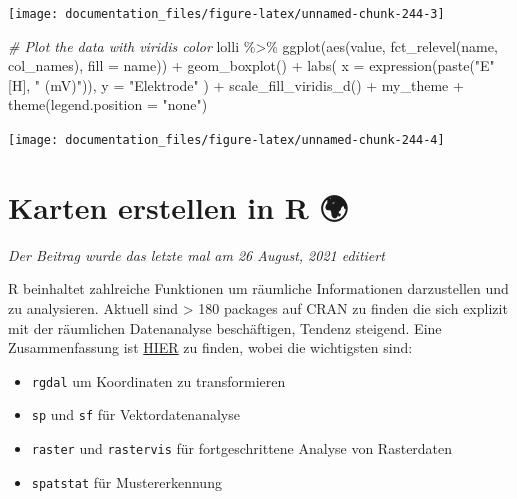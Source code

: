\documentclass[
]{article}
\newenvironment{Shaded}{\begin{snugshade}}{\end{snugshade}}
\newcommand{\AttributeTok}[1]{\textcolor[rgb]{0.77,0.63,0.00}{#1}}
\newcommand{\CommentTok}[1]{\textcolor[rgb]{0.56,0.35,0.01}{\textit{#1}}}
\newcommand{\FunctionTok}[1]{\textcolor[rgb]{0.00,0.00,0.00}{#1}}
\newcommand{\NormalTok}[1]{#1}
\newcommand{\SpecialCharTok}[1]{\textcolor[rgb]{0.00,0.00,0.00}{#1}}
\newcommand{\StringTok}[1]{\textcolor[rgb]{0.31,0.60,0.02}{#1}}
\providecommand{\tightlist}{%
  \setlength{\itemsep}{0pt}\setlength{\parskip}{0pt}}
\begin{document}
\begin{center}\texttt{[image: documentation\_files/figure-latex/unnamed-chunk-244-3]} \end{center}

\begin{Shaded}
\begin{Highlighting}[]

\CommentTok{\# Plot the data with viridis color}
\NormalTok{lolli }\SpecialCharTok{\%\textgreater{}\%}
  \FunctionTok{ggplot}\NormalTok{(}\FunctionTok{aes}\NormalTok{(value, }\FunctionTok{fct\_relevel}\NormalTok{(name, col\_names), }\AttributeTok{fill =}\NormalTok{ name)) }\SpecialCharTok{+} 
  \FunctionTok{geom\_boxplot}\NormalTok{() }\SpecialCharTok{+}
  \FunctionTok{labs}\NormalTok{(}
    \AttributeTok{x =} \FunctionTok{expression}\NormalTok{(}\FunctionTok{paste}\NormalTok{(}\StringTok{"E"}\NormalTok{ [H], }\StringTok{" (mV)"}\NormalTok{)),}
    \AttributeTok{y =} \StringTok{"Elektrode"}
\NormalTok{  ) }\SpecialCharTok{+}
  \FunctionTok{scale\_fill\_viridis\_d}\NormalTok{() }\SpecialCharTok{+}
\NormalTok{  my\_theme }\SpecialCharTok{+}
  \FunctionTok{theme}\NormalTok{(}\AttributeTok{legend.position =} \StringTok{"none"}\NormalTok{)}
\end{Highlighting}
\end{Shaded}

\begin{center}\texttt{[image: documentation\_files/figure-latex/unnamed-chunk-244-4]} \end{center}

\hypertarget{karten-erstellen-in-r}{%
\section{Karten erstellen in R 🌍}\label{karten-erstellen-in-r}}

\emph{Der Beitrag wurde das letzte mal am 26 August, 2021 editiert}

R beinhaltet zahlreiche Funktionen um räumliche Informationen darzustellen und zu analysieren. Aktuell sind \textgreater{} 180 packages auf CRAN zu finden die sich explizit mit der räumlichen Datenanalyse beschäftigen, Tendenz steigend. Eine Zusammenfassung ist \href{https://cran.r-project.org/web/views/Spatial.html}{HIER} zu finden, wobei die wichtigsten sind:

\begin{itemize}
\tightlist
\item
  \texttt{rgdal} um Koordinaten zu transformieren
\item
  \texttt{sp} und \texttt{sf} für Vektordatenanalyse
\item
  \texttt{raster} und \texttt{rastervis} für fortgeschrittene Analyse von Rasterdaten
\item
  \texttt{spatstat} für Mustererkennung
\end{itemize}
\end{document}
